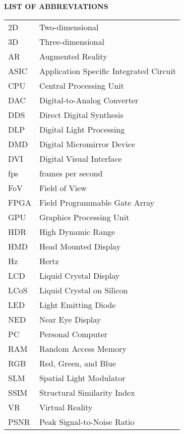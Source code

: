 {}

\begin{center}
\textbf{LIST OF ABBREVIATIONS}
\vspace{16pt}
\end{center}


\noindent
\begin{tabular}{p{0.8in} p{5in}}
2D & Two-dimensional\\
3D & Three-dimensional\\
AR & Augmented Reality\\
ASIC & Application Specific Integrated Circuit\\
CPU & Central Processing Unit\\
DAC & Digital-to-Analog Converter\\
DDS & Direct Digital Synthesis\\
DLP & Digital Light Processing\\
DMD & Digital Micromirror Device\\
DVI & Digital Visual Interface\\
fps & frames per second\\
FoV & Field of View\\
FPGA & Field Programmable Gate Array\\
GPU & Graphics Processing Unit\\
HDR & High Dynamic Range\\
HMD & Head Mounted Display\\
Hz & Hertz\\
LCD & Liquid Crystal Display\\
LCoS & Liquid Crystal on Silicon\\
LED & Light Emitting Diode\\
NED & Near Eye Display\\
PC & Personal Computer\\
RAM & Random Access Memory\\
RGB & Red, Green, and Blue\\
SLM & Spatial Light Modulator\\
SSIM & Structural Similarity Index\\
VR & Virtual Reality\\
PSNR & Peak Signal-to-Noise Ratio
\end{tabular}
\clearpage